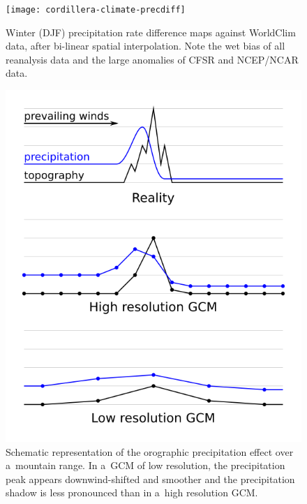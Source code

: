 \documentclass[tc, ms]{copernicus}
\begin{document}
\begin{figure}[t]
	\vspace*{2mm}
	\begin{center}
		\texttt{[image: cordillera-climate-precdiff]}
	\end{center}
	\caption{Winter (DJF) precipitation rate difference maps against WorldClim data, after bi-linear spatial interpolation. Note the wet bias of all reanalysis data and the large anomalies of CFSR and NCEP/NCAR data.}
	\label{fig:precdiff}
\end{figure}

\begin{figure}[t]
	\vspace*{2mm}
	\begin{center}
		\includegraphics{cordillera-climate-oroprecip}
	\end{center}
	\caption{Schematic representation of the orographic precipitation effect over a~mountain range. In a~GCM of low resolution, the precipitation peak appears downwind-shifted and smoother and the precipitation shadow is less pronounced than in a~high resolution GCM.}
	\label{fig:oroprecip}
\end{figure}
\end{document}
